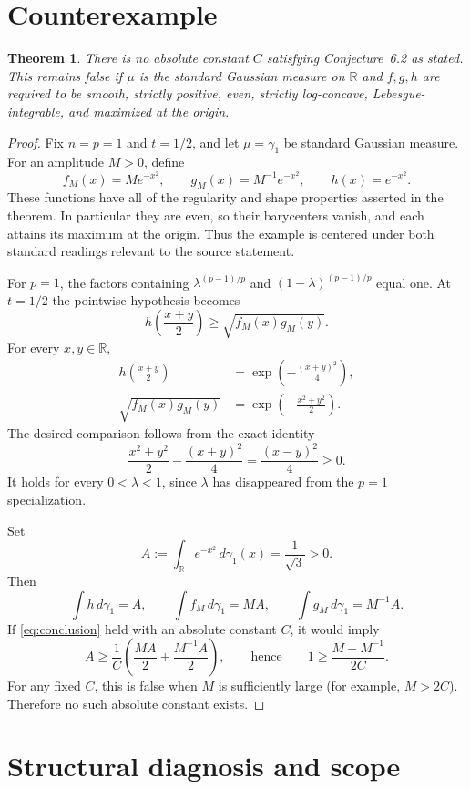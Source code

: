 \documentclass[11pt]{article}
\newtheorem{theorem}{Theorem}
\newcommand{\R}{\mathbb{R}}
\newcommand{\gauss}{\gamma_1}
\begin{document}
\section{Counterexample}

\begin{theorem}\label{thm:counterexample}
There is no absolute constant $C$ satisfying Conjecture~6.2 as stated.  This remains false if
$\mu$ is the standard Gaussian measure on $\R$ and $f,g,h$ are required to be smooth, strictly
positive, even, strictly log-concave, Lebesgue-integrable, and maximized at the origin.
\end{theorem}

\begin{proof}
Fix $n=p=1$ and $t=1/2$, and let $\mu=\gauss$ be standard Gaussian measure.  For an
amplitude $M>0$, define
\[
f_M(x)=M e^{-x^2},\qquad g_M(x)=M^{-1}e^{-x^2},\qquad h(x)=e^{-x^2}.
\]
These functions have all of the regularity and shape properties asserted in the theorem.  In
particular they are even, so their barycenters vanish, and each attains its maximum at the origin.
Thus the example is centered under both standard readings relevant to the source statement.

For $p=1$, the factors containing $\lambda^{(p-1)/p}$ and
$(1-\lambda)^{(p-1)/p}$ equal one.  At $t=1/2$ the pointwise hypothesis becomes
\[
h\left(\frac{x+y}{2}\right)\geq \sqrt{f_M(x)g_M(y)}.
\]
For every $x,y\in\R$,
\begin{align*}
h\left(\frac{x+y}{2}\right)
&=\exp\left(-\frac{(x+y)^2}{4}\right),\\
\sqrt{f_M(x)g_M(y)}
&=\exp\left(-\frac{x^2+y^2}{2}\right).
\end{align*}
The desired comparison follows from the exact identity
\[
\frac{x^2+y^2}{2}-\frac{(x+y)^2}{4}=\frac{(x-y)^2}{4}\geq0.
\]
It holds for every $0<\lambda<1$, since $\lambda$ has disappeared from the $p=1$ specialization.

Set
\[
A:=\int_{\R}e^{-x^2}\,d\gauss(x)=\frac{1}{\sqrt3}>0.
\]
Then
\[
\int h\,d\gauss=A,\qquad
\int f_M\,d\gauss=MA,\qquad
\int g_M\,d\gauss=M^{-1}A.
\]
If \eqref{eq:conclusion} held with an absolute constant $C$, it would imply
\[
A\geq\frac{1}{C}\left(\frac{MA}{2}+\frac{M^{-1}A}{2}\right),
\qquad\text{hence}\qquad
1\geq\frac{M+M^{-1}}{2C}.
\]
For any fixed $C$, this is false when $M$ is sufficiently large (for example, $M>2C$).
Therefore no such absolute constant exists.
\end{proof}

\section{Structural diagnosis and scope}
\end{document}
